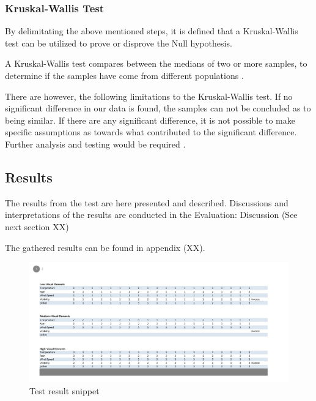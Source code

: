 \subsubsection{Kruskal-Wallis Test} %
\label{ssub:kruskal_wallis_test}

By delimitating the above mentioned steps, it is defined that a Kruskal-Wallis test can be utilized to prove or disprove the Null hypothesis.


A Kruskal-Wallis test compares between the medians of two or more samples, to determine if the samples have come from different populations \cite*{Gaten2000}.


There are however, the following limitations to the Kruskal-Wallis test.
If no significant difference in our data is found, the samples can not be concluded as to being similar.
If there are any significant difference, it is not possible to make specific assumptions as towards what contributed to the significant difference. 
Further analysis and testing would be required \cite*{Gaten2000}.





\subsection{Results} %
\label{sub:results}

The results from the test are here presented and described. 
Discussions and interpretations of the results are conducted in the Evaluation: Discussion (See next section XX)

The gathered results can be found in appendix (XX).

\begin{figure}[!htbp]
    \centering
    \includegraphics[width=1\textwidth]{images/Evaluation1.jpg}
    \caption{Test result snippet}
    \label{fig:evaluation1}
\end{figure}

